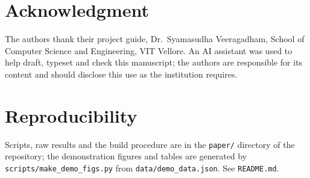 \documentclass[conference]{IEEEtran}
\newcommand{\code}[1]{\texttt{#1}}
\begin{document}
\section*{Acknowledgment}
The authors thank their project guide, Dr.\ Syamasudha Veeragadham, School of Computer Science and Engineering, VIT Vellore. An AI assistant was used to help draft, typeset and check this manuscript; the authors are responsible for its content and should disclose this use as the institution requires.

\section*{Reproducibility}
Scripts, raw results and the build procedure are in the \code{paper/} directory of the repository; the demonstration figures and tables are generated by \code{scripts/make\_demo\_figs.py} from \code{data/demo\_data.json}. See \code{README.md}.
\end{document}

